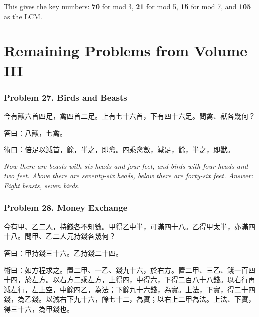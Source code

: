 \documentclass[11pt,a4paper]{article}
\newcommand{\zh}[1]{{\CJKfamily{}#1}}
\begin{document}
This gives the key numbers: \textbf{70} for mod 3, \textbf{21} for mod 5, \textbf{15} for mod 7, and \textbf{105} as the LCM.

\newpage

\section*{Remaining Problems from Volume III}

\subsubsection*{Problem 27. Birds and Beasts}

\begin{problembox}[title=\zh{問}]
\zh{今有獸六首四足，禽四首二足。上有七十六首，下有四十六足。問禽、獸各幾何？}
\end{problembox}
\begin{answerbox}[title=\zh{答}]
\zh{答曰：八獸，七禽。}
\end{answerbox}
\begin{methodbox}[title=\zh{術}]
\zh{術曰：倍足以減首，餘，半之，即禽。四乘禽數，減足，餘，半之，即獸。}
\end{methodbox}

\textit{Now there are beasts with six heads and four feet, and birds with four heads and two feet. Above there are seventy-six heads, below there are forty-six feet. Answer: Eight beasts, seven birds.}

\subsubsection*{Problem 28. Money Exchange}

\begin{problembox}[title=\zh{問}]
\zh{今有甲、乙二人，持錢各不知數。甲得乙中半，可滿四十八。乙得甲太半，亦滿四十八。問甲、乙二人元持錢各幾何？}
\end{problembox}
\begin{answerbox}[title=\zh{答}]
\zh{答曰：甲持錢三十六。乙持錢二十四。}
\end{answerbox}
\begin{methodbox}[title=\zh{術}]
\zh{術曰：如方程求之。置二甲、一乙、錢九十六，於右方。置二甲、三乙、錢一百四十四，於左方。以右方二乘左方，上得四，中得六，下得二百八十八錢。以右行再減左行，左上空，中餘四乙，為法；下餘九十六錢，為實。上法，下實，得二十四錢，為乙錢。以減右下九十六，餘七十二，為實；以右上二甲為法。上法、下實，得三十六，為甲錢也。}
\end{methodbox}
\end{document}
